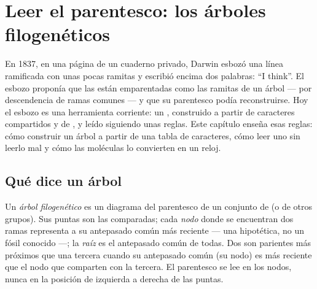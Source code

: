 \chapter{Leer el parentesco: los árboles filogenéticos}\label{ch:g12:phylogenetic-trees}

En 1837, en una página de un cuaderno privado, Darwin esbozó una línea
ramificada con unas pocas ramitas y escribió encima dos palabras: ``I
think''. El esbozo proponía que las  están emparentadas como
las ramitas de un árbol --- por descendencia de ramas comunes --- y que
su parentesco podía reconstruirse. Hoy el esbozo es una herramienta
corriente: un , construido a partir de caracteres
compartidos y de , y leído siguiendo unas reglas. Este capítulo
enseña esas reglas: cómo construir un árbol a partir de una tabla de
caracteres, cómo leer uno sin leerlo mal y cómo las moléculas lo
convierten en un reloj.

\section{Qué dice un árbol}

\begin{definition}\label{def:g12:phylogenetic-trees:tree}
Un \emph{árbol filogenético} es un diagrama
del parentesco de un conjunto de  (o de otros grupos). Sus
puntas son las  comparadas; cada \emph{nodo} donde se
encuentran dos ramas representa a su antepasado común más reciente ---
una  hipotética, no un fósil conocido ---; la \emph{raíz} es el
antepasado común de todas. Dos  son parientes más próximos que
una tercera cuando su antepasado común (su nodo) es más reciente que el
nodo que comparten con la tercera. El parentesco se lee en los nodos,
nunca en la posición de izquierda a derecha de las puntas.
\end{definition}

